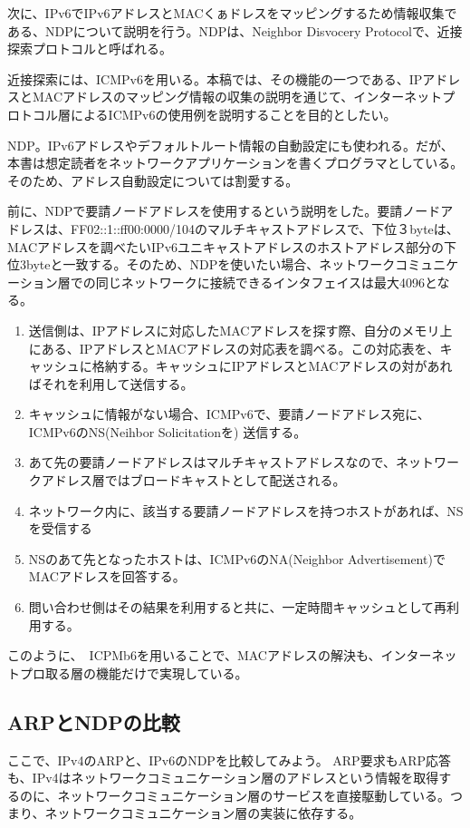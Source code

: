 次に、IPv6でIPv6アドレスとMACくぁドレスをマッピングするため情報収集である、NDPについて説明を行う。NDPは、Neighbor Disvocery Protocolで、近接探索プロトコルと呼ばれる。

近接探索には、ICMPv6を用いる。本稿では、その機能の一つである、IPアドレスとMACアドレスのマッピング情報の収集の説明を通じて、インターネットプロトコル層によるICMPv6の使用例を説明することを目的としたい。

NDP。IPv6アドレスやデフォルトルート情報の自動設定にも使われる。だが、本書は想定読者をネットワークアプリケーションを書くプログラマとしている。そのため、アドレス自動設定については割愛する。

前に、NDPで要請ノードアドレスを使用するという説明をした。要請ノードアドレスは、FF02::1::ff00:0000/104のマルチキャストアドレスで、下位３byteは、MACアドレスを調べたいIPv6ユニキャストアドレスのホストアドレス部分の下位3byteと一致する。そのため、NDPを使いたい場合、ネットワークコミュニケーション層での同じネットワークに接続できるインタフェイスは最大4096となる。


\begin{enumerate}
\item 送信側は、IPアドレスに対応したMACアドレスを探す際、自分のメモリ上にある、IPアドレスとMACアドレスの対応表を調べる。この対応表を、キャッシュに格納する。キャッシュにIPアドレスとMACアドレスの対があればそれを利用して送信する。
\item キャッシュに情報がない場合、ICMPv6で、要請ノードアドレス宛に、ICMPv6のNS(Neihbor Solicitationを)
送信する。
\item あて先の要請ノードアドレスはマルチキャストアドレスなので、ネットワークアドレス層ではブロードキャストとして配送される。
\item ネットワーク内に、該当する要請ノードアドレスを持つホストがあれば、NSを受信する
\item NSのあて先となったホストは、ICMPv6のNA(Neighbor Advertisement)でMACアドレスを回答する。
\item 問い合わせ側はその結果を利用すると共に、一定時間キャッシュとして再利用する。
\end{enumerate}

このように、　ICPMb6を用いることで、MACアドレスの解決も、インターネットプロ取る層の機能だけで実現している。

\subsection{ARPとNDPの比較}

ここで、IPv4のARPと、IPv6のNDPを比較してみよう。
ARP要求もARP応答も、IPv4はネットワークコミュニケーション層のアドレスという情報を取得するのに、ネットワークコミュニケーション層のサービスを直接駆動している。つまり、ネットワークコミュニケーション層の実装に依存する。

